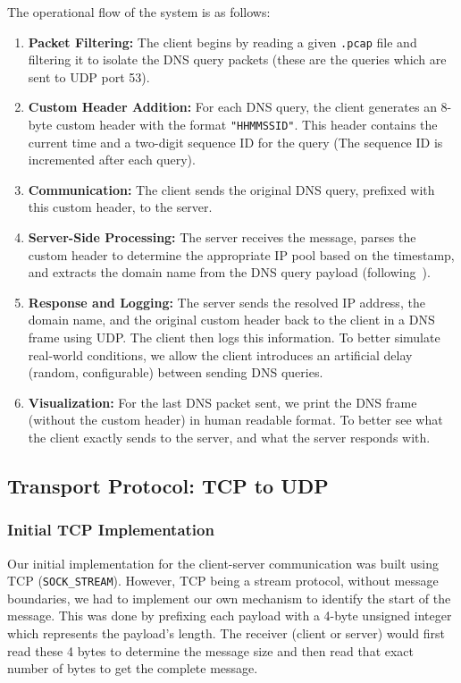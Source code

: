 \documentclass{article}
\begin{document}
The operational flow of the system is as follows:
\begin{enumerate}
    \item \textbf{Packet Filtering:} The client begins by reading a given \texttt{.pcap} file and filtering it to isolate the DNS query packets (these are the queries which are sent to UDP port 53).
    \item \textbf{Custom Header Addition:} For each DNS query, the client generates an 8-byte custom header with the format \texttt{"HHMMSSID"}. This header contains the current time and a two-digit sequence ID for the query (The sequence ID is incremented after each query).
    \item \textbf{Communication:} The client sends the original DNS query, prefixed with this custom header, to the server.
    \item \textbf{Server-Side Processing:} The server receives the message, parses the custom header to determine the appropriate IP pool based on the timestamp, and extracts the domain name from the DNS query payload (following~\cite{rfc1035}).
    \item \textbf{Response and Logging:} The server sends the resolved IP address, the domain name, and the original custom header back to the client in a DNS frame using UDP. The client then logs this information. To better simulate real-world conditions, we allow the client introduces an artificial delay (random, configurable) between sending DNS queries.
    \item \textbf{Visualization:} For the last DNS packet sent, we print the DNS frame (without the custom header) in human readable format. To better see what the client exactly sends to the server, and what the server responds with.
\end{enumerate}

\subsection{Transport Protocol: TCP to UDP}

\subsubsection{Initial TCP Implementation}
Our initial implementation for the client-server communication was built using TCP (\texttt{SOCK\_STREAM}). However, TCP being a stream protocol, without message boundaries, we had to implement our own mechanism to identify the start of the message. This was done by prefixing each payload with a 4-byte unsigned integer which represents the payload's length. The receiver (client or server) would first read these 4 bytes to determine the message size and then read that exact number of bytes to get the complete message.
\end{document}
